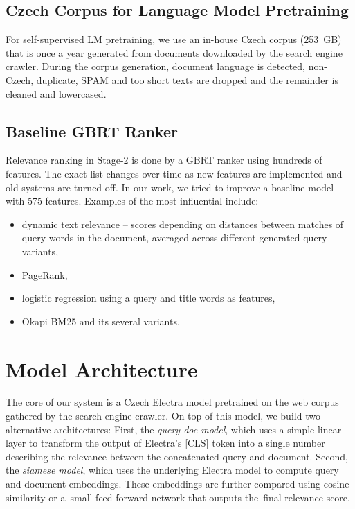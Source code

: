 \documentclass[letterpaper]{article} \usepackage{aaai22 }  \usepackage{times}  \usepackage{helvet}  \usepackage{courier}  \usepackage[hyphens]{url}  \usepackage{graphicx} \usepackage{amsmath,amsfonts,amssymb, mathabx,bm,bbm}
\begin{document}
\subsection{Czech Corpus for Language Model Pretraining}
\label{ssec:czech_corpus_pretraining}
For self-supervised LM pretraining, we use an in-house Czech corpus (253~GB) that is once a year generated from documents downloaded by the search engine crawler. During the corpus generation, document language is detected, non-Czech, duplicate, SPAM and too short texts are dropped and the remainder is cleaned and lowercased.

\subsection{Baseline GBRT Ranker}
Relevance ranking in Stage-2 is done by a GBRT ranker using hundreds of features. The exact list changes over time as new features are implemented and old systems are turned off. In our work, we tried to improve a baseline model with 575 features. Examples of the most influential include:

\begin{itemize}
    \item dynamic text relevance -- scores depending on distances between matches of query words in the document, averaged across different generated query variants,
    \item PageRank,
    \item logistic regression using a query and title words as features,
    \item Okapi BM25 and its several variants.
\end{itemize}

\section{Model Architecture}\label{sec:model_architecture}

The core of our system is a Czech Electra model pretrained on the web corpus gathered by the search engine crawler. On top of this model, we build two alternative architectures: First, the \emph{query-doc model}, which uses a simple linear layer to transform the output of Electra's [CLS] token into a single number describing the relevance between the concatenated query and document. Second, the \textit{siamese model}, which uses the underlying Electra model to compute query and document embeddings. These embeddings are further compared using cosine similarity or a~small feed-forward network that outputs the~final relevance score.
\end{document}
